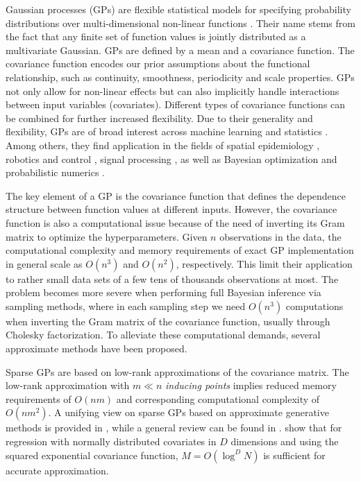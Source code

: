 \documentclass[onecolumn,a4paper,11pt]{article}
\begin{document}
Gaussian processes (GPs) are flexible statistical models for specifying probability distributions over multi-dimensional non-linear functions \citep{rasmussen2006gaussian,neal1997monte}. Their name stems from the fact that any finite set of function values is jointly distributed as a multivariate Gaussian. GPs are defined by a mean and a covariance function. The covariance function encodes our prior assumptions about the functional relationship, such as continuity, smoothness, periodicity and scale properties. GPs not only allow for non-linear effects but can also implicitly handle interactions between input variables (covariates). Different types of covariance functions can be combined for further increased flexibility. Due to their generality and flexibility, GPs are of broad interest across machine learning and statistics \citep{rasmussen2006gaussian,neal1997monte}. Among others, they find application in the fields of spatial epidemiology \citep{diggle2013statistical,carlin2014hierarchical}, robotics and control \citep{deisenroth2015gaussian}, signal processing \citep{sarkka2013spatiotemporal}, as well as Bayesian optimization and probabilistic numerics \citep{roberts2010bayesian,briol2015probabilistic,hennig2015probabilistic}.

The key element of a GP is the covariance function that defines the dependence structure between function values at different inputs. However, the covariance function is also a computational issue because of the need of inverting its Gram matrix to optimize the hyperparameters. Given $n$ observations in the data, the computational complexity and memory requirements of exact GP implementation in general scale as $O(n^3)$ and $O(n^2)$, respectively. This limit their application to rather small data sets of a few tens of thousands observations at most. The problem becomes more severe when performing full Bayesian inference via sampling methods, where in each sampling step we need $O(n^3)$ computations when inverting the Gram matrix of the covariance function, usually through Cholesky factorization. To alleviate these computational demands, several approximate methods have been proposed. 

Sparse GPs are based on low-rank approximations of the covariance matrix. The low-rank approximation with $m \ll n$ {\it inducing points} implies reduced memory requirements of $O(nm)$ and corresponding computational complexity of $O(nm^2)$.
A unifying view on sparse GPs based on approximate generative methods
is provided in \cite{quinonero2005unifying}, while a general review
can be found in \cite{rasmussen2006gaussian}. \citet{Burt+Rasmussen+vanderWilk:2019} show that for regression with normally distributed covariates in $D$ dimensions and using the squared exponential covariance function, $M=O(\log^DN)$ is sufficient for accurate approximation.
\end{document}
